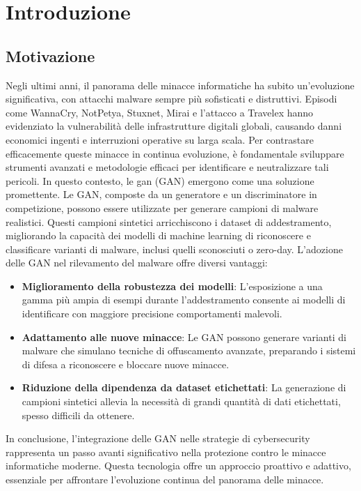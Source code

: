 \chapter{Introduzione}
\label{cap:introduzione}

\section{Motivazione}
Negli ultimi anni, il panorama delle minacce informatiche ha subito un'evoluzione significativa, con attacchi malware sempre più sofisticati e distruttivi. Episodi come WannaCry, NotPetya, Stuxnet, Mirai e l'attacco a Travelex hanno evidenziato la vulnerabilità delle infrastrutture digitali globali, causando danni economici ingenti e interruzioni operative su larga scala.
Per contrastare efficacemente queste minacce in continua evoluzione, è fondamentale sviluppare strumenti avanzati e metodologie efficaci per identificare e neutralizzare tali pericoli. In questo contesto, le \gls{gan} (GAN) emergono come una soluzione promettente. Le GAN, composte da un generatore e un discriminatore in competizione, possono essere utilizzate per generare campioni di malware realistici. Questi campioni sintetici arricchiscono i dataset di addestramento, migliorando la capacità dei modelli di machine learning di riconoscere e classificare varianti di malware, inclusi quelli sconosciuti o zero-day.
L'adozione delle GAN nel rilevamento del malware offre diversi vantaggi:
\begin{itemize} 
    \item \textbf{Miglioramento della robustezza dei modelli}: L'esposizione a una gamma più ampia di esempi durante l'addestramento consente ai modelli di identificare con maggiore precisione comportamenti malevoli. 
    \item \textbf{Adattamento alle nuove minacce}: Le GAN possono generare varianti di malware che simulano tecniche di offuscamento avanzate, preparando i sistemi di difesa a riconoscere e bloccare nuove minacce. 
    \item \textbf{Riduzione della dipendenza da dataset etichettati}: La generazione di campioni sintetici allevia la necessità di grandi quantità di dati etichettati, spesso difficili da ottenere. 
\end{itemize}
In conclusione, l'integrazione delle GAN nelle strategie di \gls{cybersecurity} rappresenta un passo avanti significativo nella protezione contro le minacce informatiche moderne. Questa tecnologia offre un approccio proattivo e adattivo, essenziale per affrontare l'evoluzione continua del panorama delle minacce.


